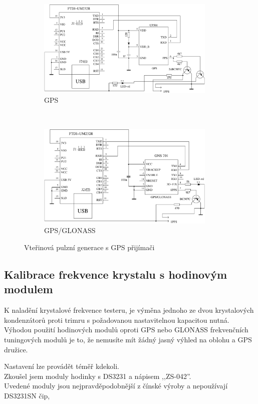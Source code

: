 \begin{figure}[H]
  \begin{subfigure}[b]{9cm}
    \centering
    \includegraphics[width=8.5cm]{../FIG/GPS_UP501.pdf}
    \caption{GPS}
  \end{subfigure}
  ~
  \begin{subfigure}[b]{9cm}
    \centering
    \includegraphics[width=8.5cm]{../FIG/GPS_GNS701.pdf}
    \caption{GPS/GLONASS}
  \end{subfigure}
  \caption{Vteřinová pulzní generace s GPS přijímači}
  \label{fig:GPS-1PPS}
\end{figure}

\subsection{Kalibrace frekvence krystalu s hodinovým modulem}

K naladění krystalové frekvence testeru, je výměna jednoho ze dvou krystalových kondenzátorů
proti trimru s požadovanou nastavitelnou kapacitou nutná.
\\Výhodou použití hodinových modulů oproti GPS nebo GLONASS frekvenčních tuningových modulů je to,
že nemusíte mít žádný jasný výhled na oblohu a GPS družice.

Nastavení lze provádět téměř kdekoli.
\\Zkoušel jsem moduly hodinky s DS3231 a nápisem ,,ZS-042''.
\\Uvedené moduly jsou nejpravděpodobnější z čínské výroby a nepoužívají DS3231SN čip,

